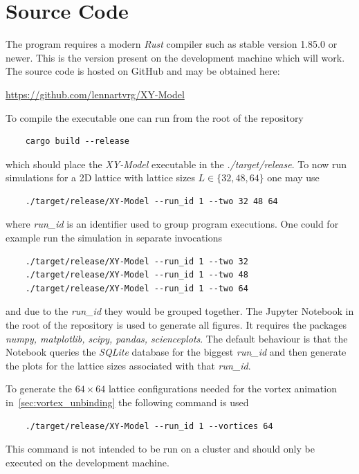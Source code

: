 \section{Source Code}\label{app:source_code}
The program requires a modern \emph{Rust} compiler such as stable version 1.85.0 or newer. This is the version present on the development machine which will work. The source code is hosted on GitHub and may be obtained here:
\begin{center}
	\url{https://github.com/lennartvrg/XY-Model}
\end{center}
To compile the executable one can run from the root of the repository
\begin{verbatim}
	cargo build --release
\end{verbatim}
which should place the \textit{XY-Model} executable in the \textit{./target/release}. To now run simulations for a 2D lattice with lattice sizes $L\in\{32, 48, 64\}$ one may use
\begin{verbatim}
	./target/release/XY-Model --run_id 1 --two 32 48 64
\end{verbatim}
where \textit{{run\_id}} is an identifier used to group program executions. One could for example run the simulation in separate invocations
\begin{verbatim}
	./target/release/XY-Model --run_id 1 --two 32
	./target/release/XY-Model --run_id 1 --two 48
	./target/release/XY-Model --run_id 1 --two 64
\end{verbatim}
and due to the \textit{{run\_id}} they would be grouped together. The Jupyter Notebook in the root of the repository is used to generate all figures. It requires the packages \textit{numpy, matplotlib, scipy, pandas, scienceplots}. The default behaviour is that the Notebook queries the \emph{SQLite} database for the biggest \textit{{run\_id}} and then generate the plots for the lattice sizes associated with that \textit{{run\_id}}.

To generate the $64\times64$ lattice configurations needed for the vortex animation in~\cref{sec:vortex_unbinding} the following command is used
\begin{verbatim}
	./target/release/XY-Model --run_id 1 --vortices 64
\end{verbatim}
This command is not intended to be run on a cluster and should only be executed on the development machine.

